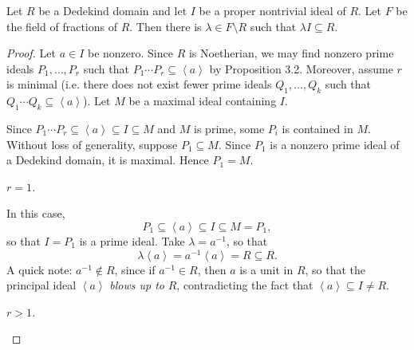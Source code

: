 \documentclass[pmath441]{subfiles}
\begin{document}
    \begin{lemma}{}
        Let $R$ be a Dedekind domain and let $I$ be a proper nontrivial ideal of $R$. Let $F$ be the field of fractions of $R$. Then there is $\lambda\in F\setminus R$ such that $\lambda I\subseteq R$.
    \end{lemma}

    \begin{proof}
        Let $a\in I$ be nonzero. Since $R$ is Noetherian, we may find nonzero prime ideals $P_1,\ldots,P_r$ such that $P_1\cdots P_r\subseteq\left< a \right>$ by Proposition 3.2. Moreover, assume $r$ is minimal (i.e. there does not exist fewer prime ideals $Q_1,\ldots,Q_k$ such that $Q_1\cdots Q_k\subseteq\left< a \right>$). Let $M$ be a maximal ideal containing $I$.

        Since $P_1\cdots P_r\subseteq\left< a \right>\subseteq I\subseteq M$ and $M$ is prime, some $P_i$ is contained in $M$. Without loss of generality, suppose $P_1\subseteq M$. Since $P_1$ is a nonzero prime ideal of a Dedekind domain, it is maximal. Hence $P_1 = M$.

        \begin{case}
            \textit{$r=1$.}

            In this case,
            \begin{equation*}
                P_1\subseteq \left< a \right> \subseteq I \subseteq M = P_1, 
            \end{equation*}
            so that $I = P_1$ is a prime ideal. Take $\lambda = a^{-1}$, so that
            \begin{equation*}
                \lambda\left< a \right> = a^{-1}\left< a \right> = R \subseteq R.  
            \end{equation*}
            A quick note: $a^{-1}\notin R$, since if $a^{-1}\in R$, then $a$ is a unit in $R$, so that the principal ideal $\left< a \right>$ \textit{blows up to} $R$, contradicting the fact that $\left< a \right> \subseteq I\neq R$.  
        \end{case}

        \begin{case}
            \textit{$r>1$.}


\end{case}
\end{proof}
\end{document}
